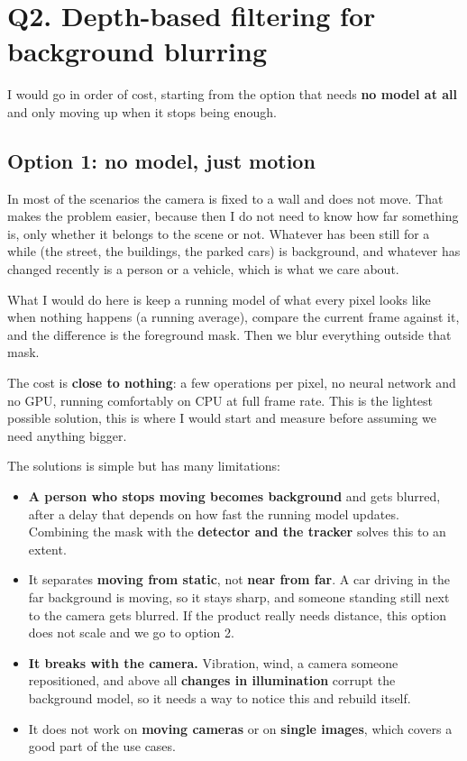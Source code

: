 \documentclass[11pt,a4paper]{article}
\begin{document}
\section*{Q2. Depth-based filtering for background blurring}

I would go in order of cost, starting from the option that needs \textbf{no model at all} and
only moving up when it stops being enough.

\subsection*{Option 1: no model, just motion}

In most of the scenarios the camera is
fixed to a wall and does not move. That makes the problem easier, because then I do not need to know how far something is, only whether it belongs to the scene or not. Whatever has been still for a while (the street, the buildings, the parked cars) is background, and whatever has changed recently is a person or a vehicle, which is what we care about.

What I would do here is keep a running model of what every pixel looks
like when nothing happens (a running average), compare the current frame against it, and the difference is the foreground mask. Then we blur everything outside that mask.

The cost is \textbf{close to nothing}: a few operations per pixel, no neural network and no
GPU, running comfortably on CPU at full frame rate. This is the lightest possible solution, this is where I would start and measure before assuming we need anything bigger.

The solutions is simple but has many limitations: 

\begin{itemize}
  \item \textbf{A person who stops moving becomes background} and gets blurred, after a
    delay that depends on how fast the running model updates. Combining the mask with the
    \textbf{detector and the tracker} solves this to an extent.
  \item It separates \textbf{moving from static},
    not \textbf{near from far}. A car driving in the far background is moving, so it stays
    sharp, and someone standing still next to the camera gets blurred. If the product really
    needs distance, this option does not scale and we go to option 2.
  \item \textbf{It breaks with the camera.} Vibration, wind, a camera someone repositioned, and
    above all \textbf{changes in illumination} corrupt the background model, so it needs a way to notice this and rebuild itself.
  \item It does not work on \textbf{moving cameras} or on \textbf{single images}, which covers
    a good part of the use cases.
\end{itemize}
\end{document}
